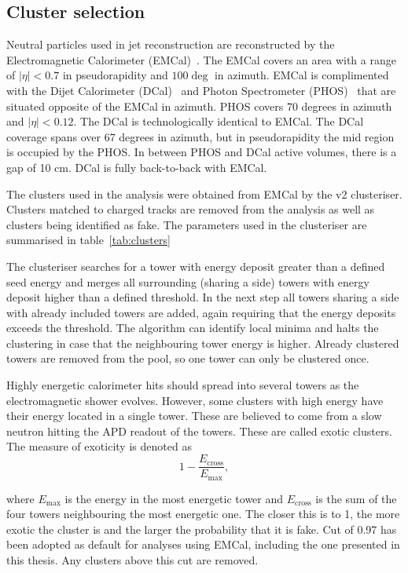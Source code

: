 \subsection{Cluster selection}
Neutral particles used in jet reconstruction are reconstructed by the Electromagnetic Calorimeter (EMCal)~\cite{Cortese:2008zza}. The EMCal covers an area with a range of $|\eta| < 0.7$  in pseudorapidity and $ 100 \deg $ in azimuth. EMCal is complimented with the Dijet Calorimeter (DCal)~\cite{DCAL} and Photon Spectrometer (PHOS)~\cite{PHOS} that are situated opposite of the EMCal in azimuth. PHOS covers 70 degrees in azimuth and $\left| \eta \right| < 0.12$. The DCal is technologically identical to EMCal. The DCal coverage spans over 67 degrees in azimuth, but in pseudorapidity the mid region is occupied by the PHOS. In between PHOS and DCal active volumes, there is a gap of 10 cm. DCal is fully back-to-back with EMCal.


The clusters used in the analysis were obtained from EMCal {\color{red}by the v2 clusteriser}. Clusters matched to charged tracks are removed from the analysis as well as clusters being identified as fake. The parameters used in the clusteriser are summarised in table~\ref{tab:clusters}


The clusteriser  searches for a tower with energy deposit greater than a defined seed energy and merges all surrounding (sharing a side) towers with energy deposit higher than a defined threshold. In the next step all towers sharing a side with already included towers are added, again requiring that the energy deposits exceeds the threshold. The algorithm can identify local minima and halts the clustering in case that the neighbouring tower energy is higher. Already clustered towers are removed from the pool, so one tower can only be clustered once.

Highly energetic calorimeter hits should spread into several towers as the electromagnetic shower evolves. However, some clusters with high energy have their energy located in a single tower. These are believed to come from a slow neutron hitting the APD readout of the towers. These are called exotic clusters. The measure of exoticity is denoted as 
\begin{equation}
1 -\frac{E_\mathrm{cross}}{E_\mathrm{max}},
\end{equation}

\noindent where $E_\mathrm{max}$ is the energy in the most energetic tower and $E_\mathrm{cross}$ is the sum of the four towers neighbouring the most energetic one. The closer this is to 1, the more exotic the cluster is and the larger the probability that it is fake. Cut of 0.97 has been adopted as default for analyses using EMCal, including the one presented in this thesis. Any clusters above this cut are removed.

